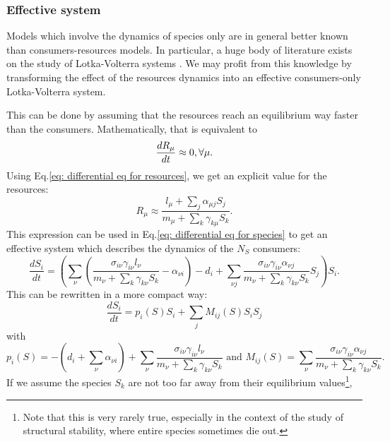\documentclass[12pt, titlepage, twoside, openright]{report}
\begin{document}
\subsubsection{Effective system}
\normalfont
Models which involve the dynamics of species only are in general better known than consumers-resources models. In particular, a huge body of literature exists on the study of Lotka-Volterra systems \cite{lotka_analytical_1920, takeuchi_global_1996}. We may profit from this knowledge by transforming the effect of the resources dynamics into an effective consumers-only Lotka-Volterra system.

This can be done by assuming that the resources reach an equilibrium way faster than the consumers.
Mathematically, that is equivalent to
\begin{equation}
  \frac{dR_\mu}{dt} \approx 0, \\ \forall \mu.
\end{equation}
Using Eq.\eqref{eq: differential eq for resources}, we get an explicit value for the resources:
\begin{equation}
  R_\mu \approx \frac{l_\mu+\sum_j \alpha_{\mu j}S_j}{m_\mu + \sum_k \gamma_{k\mu}S_k}.
\end{equation}
This expression can be used in Eq.\eqref{eq: differential eq for species} to get an effective system which describes the dynamics of the $N_S$ consumers:
\begin{equation}
  \frac{dS_i}{dt} = \left(\sum_\nu \left(\frac{\sigma_{i\nu}\gamma_{i\nu}l_\nu}{m_\nu+\sum_k \gamma_{k\nu}S_k} - \alpha_{\nu i}\right) -d_i + \sum_{\nu j} \frac{\sigma_{i\nu}\gamma_{i\nu}\alpha_{\nu j}}{m_\nu+\sum_{k}\gamma_{k\nu}S_k}S_j \right) S_i.
\end{equation}
This can be rewritten in a more compact way:
\begin{equation}
  \frac{dS_i}{dt} = p_i(S) S_i + \sum_j M_{ij}(S)S_i S_j \label{eq: effective equations of evolution}
\end{equation}
with
\begin{equation}
    p_i(S) = -\left(d_i+\sum_{\nu}\alpha_{\nu i}\right) + \sum_\nu \frac{\sigma_{i\nu}\gamma_{i\nu}l_\nu}{m_\nu+\sum_k \gamma_{k\nu}S_k}\text{ and } M_{ij}(S)=\sum_{\nu}\frac{\sigma_{i\nu}\gamma_{i\nu}\alpha_{\nu j}}{m_\nu+\sum_{k}\gamma_{k\nu}S_k}.
\end{equation}
If we assume the species $S_k$ are not too far away from their equilibrium values\footnote{Note that this is very rarely true, especially in the context of the study of structural stability, where entire species sometimes die out.}, \ie
\end{document}
